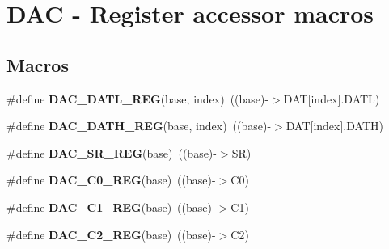 \hypertarget{group__DAC__Register__Accessor__Macros}{}\section{D\+AC -\/ Register accessor macros}
\label{group__DAC__Register__Accessor__Macros}
\subsection*{Macros}
\begin{DoxyCompactItemize}
\item 
\#define {\bfseries D\+A\+C\+\_\+\+D\+A\+T\+L\+\_\+\+R\+EG}(base,  index)~((base)-\/$>$D\+AT\mbox{[}index\mbox{]}.D\+A\+TL)\hypertarget{group__DAC__Register__Accessor__Macros_ga08d6968ef33456980d21911ea2ed00f5}{}\label{group__DAC__Register__Accessor__Macros_ga08d6968ef33456980d21911ea2ed00f5}

\item 
\#define {\bfseries D\+A\+C\+\_\+\+D\+A\+T\+H\+\_\+\+R\+EG}(base,  index)~((base)-\/$>$D\+AT\mbox{[}index\mbox{]}.D\+A\+TH)\hypertarget{group__DAC__Register__Accessor__Macros_ga53b85847dea8002316aa2880d5c27f68}{}\label{group__DAC__Register__Accessor__Macros_ga53b85847dea8002316aa2880d5c27f68}

\item 
\#define {\bfseries D\+A\+C\+\_\+\+S\+R\+\_\+\+R\+EG}(base)~((base)-\/$>$SR)\hypertarget{group__DAC__Register__Accessor__Macros_ga689d7e5290e37e3690b476afe279548c}{}\label{group__DAC__Register__Accessor__Macros_ga689d7e5290e37e3690b476afe279548c}

\item 
\#define {\bfseries D\+A\+C\+\_\+\+C0\+\_\+\+R\+EG}(base)~((base)-\/$>$C0)\hypertarget{group__DAC__Register__Accessor__Macros_ga535f8efe3924aa0e193dc9a57b4cae83}{}\label{group__DAC__Register__Accessor__Macros_ga535f8efe3924aa0e193dc9a57b4cae83}

\item 
\#define {\bfseries D\+A\+C\+\_\+\+C1\+\_\+\+R\+EG}(base)~((base)-\/$>$C1)\hypertarget{group__DAC__Register__Accessor__Macros_ga5177a56f528748e9c9e8138a130a289d}{}\label{group__DAC__Register__Accessor__Macros_ga5177a56f528748e9c9e8138a130a289d}

\item 
\#define {\bfseries D\+A\+C\+\_\+\+C2\+\_\+\+R\+EG}(base)~((base)-\/$>$C2)\hypertarget{group__DAC__Register__Accessor__Macros_ga0960302c90bdaf9930ed8dd663893ec4}{}\label{group__DAC__Register__Accessor__Macros_ga0960302c90bdaf9930ed8dd663893ec4}


\end{DoxyCompactItemize}
